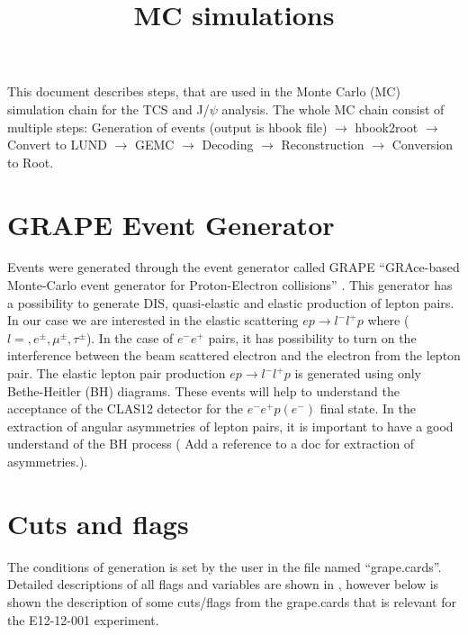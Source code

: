 \documentclass[letterpaper,12pt]{article}
\title{MC simulations}
\def \rarr {\rightarrow}
\begin{document}
 
 This document describes steps, that are used in the Monte Carlo (MC) simulation chain for the TCS and J/$\psi$ analysis.
 The whole MC chain consist of multiple steps: \newline Generation of events (output is hbook file) $\rarr$ hbook2root  $\rarr$ Convert to LUND $\rarr$ GEMC $\rarr$ Decoding $\rarr$ Reconstruction $\rarr$
 Conversion to Root.
  
 \section{GRAPE Event Generator} 
 Events were generated through the event generator called GRAPE ``GRAce-based Monte-Carlo event generator for Proton-Electron collisions'' \cite{GRAPE}.
 This generator has a possibility to generate DIS, quasi-elastic and elastic production of lepton pairs. In our case we are interested in the elastic scattering
 $ep \rarr l^{-}l^{+}p$ where ($l = , e^{\pm},\mu^{\pm}, \tau^{\pm}$). In the case of $e^{-}e^{+}$ pairs, it has possibility to turn on the interference between
 the beam scattered electron and the electron from the lepton pair. The elastic lepton pair production $ep \rarr l^{-}l^{+}p$ is generated using only Bethe-Heitler (BH) diagrams.
 These events will help to understand the acceptance of the CLAS12 detector for the $e^{-}e^{+}p (e^{-})$ final state. In the extraction of angular asymmetries of lepton pairs,
 it is important to have a good understand of the BH process ({\color{Red} Add a reference to a doc for extraction of asymmetries.}).
 \section{Cuts and flags}\label {sec:cuts_flags}
 The conditions of generation is set by the user in the file named ``grape.cards''.
 Detailed descriptions of all flags and variables are shown in \cite{GRAPE}, however below is shown the description of some cuts/flags
 from the grape.cards that is relevant for the E12-12-001 experiment.
 
\end{document}
